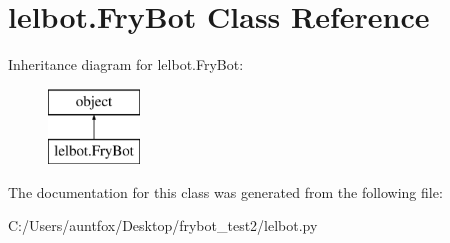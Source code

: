 \hypertarget{classlelbot_1_1_fry_bot}{}\section{lelbot.\+Fry\+Bot Class Reference}
\label{classlelbot_1_1_fry_bot}
Inheritance diagram for lelbot.\+Fry\+Bot\+:\begin{figure}[H]
\begin{center}
\leavevmode
\includegraphics[height=2.000000cm]{classlelbot_1_1_fry_bot}
\end{center}
\end{figure}


The documentation for this class was generated from the following file\+:\begin{DoxyCompactItemize}
\item 
C\+:/\+Users/auntfox/\+Desktop/frybot\+\_\+test2/lelbot.\+py\end{DoxyCompactItemize}
